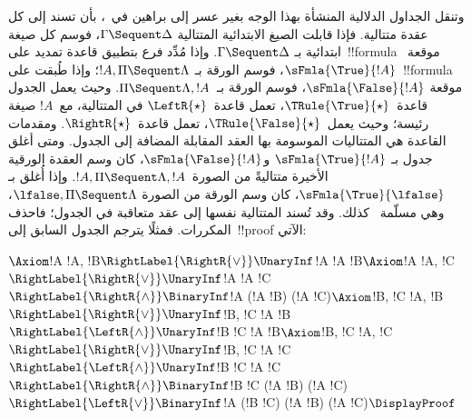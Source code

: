 \documentclass[../../../include/open-logic-section]{subfiles}
\begin{document}
وتنقل الجداول الدلالية المنشأة بهذا الوجه بغير عسر إلى براهين في~،
بأن تسند إلى كل عقدة متتالية. فإذا قابلت الصيغ الابتدائية المتتالية
$\Gamma\Sequent\Delta$، فوسم كل صيغة ابتدائية بـ
$\Gamma\Sequent\Delta$. وإذا مُدِّد فرع بتطبيق قاعدة تمديد على~!!{formula}
موقعة~$\sFmla{\True}{!A}$، فوسم الورقة بـ
$!A,\Pi\Sequent\Lambda$؛ وإذا طُبقت على~!!{formula} موقعة
$\sFmla{\False}{!A}$، فوسم الورقة بـ~$\Pi\Sequent\Lambda,!A$. وحيث يعمل
الجدول قاعدة~$\TRule{\True}{\star}$، تعمل قاعدة~$\LeftR{\star}$ في
المتتالية، مع~$!A$ صيغة رئيسة؛ وحيث يعمل~$\TRule{\False}{\star}$، تعمل
قاعدة~$\RightR{\star}$. ومقدمات القاعدة هي المتتاليات الموسومة بها العقد
المقابلة المضافة إلى الجدول. ومتى أغلق جدول بـ
$\sFmla{\True}{!A}$ و$\sFmla{\False}{!A}$، كان وسم العقدة الورقية الأخيرة
متتاليةً من الصورة~$!A,\Pi\Sequent\Lambda,!A$. وإذا أُغلق بـ
$\sFmla{\True}{\lfalse}$، كان وسم الورقة من الصورة
$\lfalse,\Pi\Sequent\Lambda$، وهي مسلّمة~ كذلك. وقد تُسند
المتتالية نفسها إلى عقد متعاقبة في الجدول؛ فاحذف المكررات. فمثلًا يترجم
الجدول السابق إلى~!!{proof} الآتي:
\begin{maxwidth}
$
\Axiom$!A \fCenter !A, !B$
\RightLabel{\RightR{\lor}}
\UnaryInf$!A \fCenter !A \lor !B$
\Axiom$!A \fCenter !A, !C$
\RightLabel{\RightR{\lor}}
\UnaryInf$!A \fCenter !A \lor !C$
\RightLabel{\RightR{\land}}
\BinaryInf$!A \fCenter (!A \lor !B) \land (!A \lor !C)$
\Axiom$!B, !C \fCenter !A, !B$
\RightLabel{\RightR{\lor}}
\UnaryInf$!B, !C \fCenter !A \lor !B$
\RightLabel{\LeftR{\land}}
\UnaryInf$!B \land !C \fCenter !A \lor !B$
\Axiom$!B, !C \fCenter !A, !C$
\RightLabel{\RightR{\lor}}
\UnaryInf$!B, !C \fCenter !A \lor !C$
\RightLabel{\LeftR{\land}}
\UnaryInf$!B \land !C \fCenter !A \lor !C$
\RightLabel{\RightR{\land}}
\BinaryInf$!B \land !C \fCenter (!A \lor !B) \land
(!A \lor !C)$
\RightLabel{\LeftR{\lor}}
\BinaryInf$!A \lor (!B \land !C) \fCenter (!A \lor !B) \land
(!A \lor !C)$
\DisplayProof$
\end{maxwidth}
\end{document}
